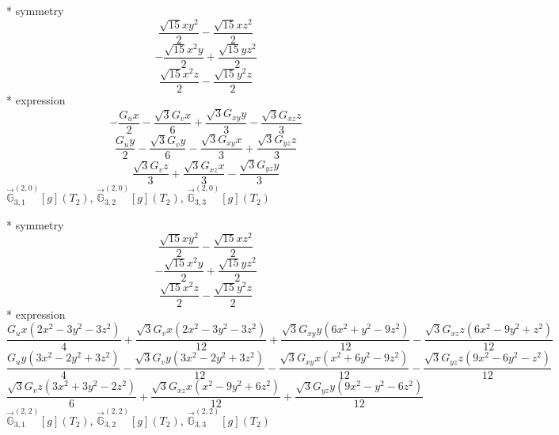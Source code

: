\documentclass[fleqn,8pt]{jsarticle}
\begin{document}
\noindent\quad ** symmetry
\begin{dmath*}
\frac{\sqrt{15} x y^{2}}{2} - \frac{\sqrt{15} x z^{2}}{2}
\end{dmath*}
\begin{dmath*}
- \frac{\sqrt{15} x^{2} y}{2} + \frac{\sqrt{15} y z^{2}}{2}
\end{dmath*}
\begin{dmath*}
\frac{\sqrt{15} x^{2} z}{2} - \frac{\sqrt{15} y^{2} z}{2}
\end{dmath*}
\noindent\quad ** expression
\begin{dmath*}
- \frac{G_{u} x}{2} - \frac{\sqrt{3} G_{v} x}{6} + \frac{\sqrt{3} G_{xy} y}{3} - \frac{\sqrt{3} G_{xz} z}{3}
\end{dmath*}
\begin{dmath*}
\frac{G_{u} y}{2} - \frac{\sqrt{3} G_{v} y}{6} - \frac{\sqrt{3} G_{xy} x}{3} + \frac{\sqrt{3} G_{yz} z}{3}
\end{dmath*}
\begin{dmath*}
\frac{\sqrt{3} G_{v} z}{3} + \frac{\sqrt{3} G_{xz} x}{3} - \frac{\sqrt{3} G_{yz} y}{3}
\end{dmath*}
\noindent\quad $\vec{\mathbb{G}}_{3,1}^{(2,0)}[g](T_{2})$, $\vec{\mathbb{G}}_{3,2}^{(2,0)}[g](T_{2})$, $\vec{\mathbb{G}}_{3,3}^{(2,0)}[g](T_{2})$

\noindent\quad ** symmetry
\begin{dmath*}
\frac{\sqrt{15} x y^{2}}{2} - \frac{\sqrt{15} x z^{2}}{2}
\end{dmath*}
\begin{dmath*}
- \frac{\sqrt{15} x^{2} y}{2} + \frac{\sqrt{15} y z^{2}}{2}
\end{dmath*}
\begin{dmath*}
\frac{\sqrt{15} x^{2} z}{2} - \frac{\sqrt{15} y^{2} z}{2}
\end{dmath*}
\noindent\quad ** expression
\begin{dmath*}
\frac{G_{u} x \left(2 x^{2} - 3 y^{2} - 3 z^{2}\right)}{4} + \frac{\sqrt{3} G_{v} x \left(2 x^{2} - 3 y^{2} - 3 z^{2}\right)}{12} + \frac{\sqrt{3} G_{xy} y \left(6 x^{2} + y^{2} - 9 z^{2}\right)}{12} - \frac{\sqrt{3} G_{xz} z \left(6 x^{2} - 9 y^{2} + z^{2}\right)}{12}
\end{dmath*}
\begin{dmath*}
\frac{G_{u} y \left(3 x^{2} - 2 y^{2} + 3 z^{2}\right)}{4} - \frac{\sqrt{3} G_{v} y \left(3 x^{2} - 2 y^{2} + 3 z^{2}\right)}{12} - \frac{\sqrt{3} G_{xy} x \left(x^{2} + 6 y^{2} - 9 z^{2}\right)}{12} - \frac{\sqrt{3} G_{yz} z \left(9 x^{2} - 6 y^{2} - z^{2}\right)}{12}
\end{dmath*}
\begin{dmath*}
\frac{\sqrt{3} G_{v} z \left(3 x^{2} + 3 y^{2} - 2 z^{2}\right)}{6} + \frac{\sqrt{3} G_{xz} x \left(x^{2} - 9 y^{2} + 6 z^{2}\right)}{12} + \frac{\sqrt{3} G_{yz} y \left(9 x^{2} - y^{2} - 6 z^{2}\right)}{12}
\end{dmath*}
\noindent\quad $\vec{\mathbb{G}}_{3,1}^{(2,2)}[g](T_{2})$, $\vec{\mathbb{G}}_{3,2}^{(2,2)}[g](T_{2})$, $\vec{\mathbb{G}}_{3,3}^{(2,2)}[g](T_{2})$
\end{document}
